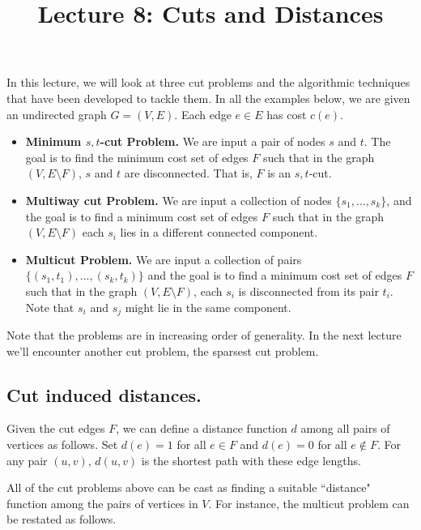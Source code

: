 \documentclass[11pt]{article}
\begin{document}
\title{Lecture 8: Cuts and Distances}
\author{}
\date{}
\maketitle
\def\x{{x^{\tt int}}}
\def\E{{\mathbf E}}
\def\Pr{{\mathbf{Pr}}}
\noindent
In this lecture, we will look at three cut problems and the algorithmic 
techniques that have been developed to tackle them. 
In all the examples below, we are given an undirected graph $G=(V,E)$.
Each edge $e\in E$ has cost $c(e)$.

\begin{itemize}
\item {\bf  Minimum $s,t$-cut Problem.} We are input a pair of nodes $s$ and $t$.
The goal is to find the minimum cost set of edges $F$ such that in the graph 
$(V,E\setminus F)$, $s$ and $t$ are disconnected. That is, $F$ is an $s,t$-cut.

\item {\bf Multiway cut Problem.} We are input a collection of nodes 
$\{s_1,\ldots,s_k\}$, and the goal is to find a minimum cost set of edges $F$
such that in the graph $(V,E\setminus F)$ each $s_i$ lies in a different
connected component.

\item {\bf Multicut Problem.} We are input a collection of pairs $\{(s_1,t_1),\ldots,(s_k,t_k)\}$
and the goal is to find a minimum cost set of edges $F$ such that 
in the graph $(V,E\setminus F)$, each $s_i$ is disconnected from its pair $t_i$.
Note that $s_i$ and $s_j$ might lie in the same component.

\end{itemize}
\noindent
Note that the problems are in increasing order of generality.
In the next lecture we'll encounter another cut problem, the sparsest 
cut problem. 

\subsection*{Cut induced distances.} Given the cut edges $F$, we can define 
a distance function $d$ among all pairs of vertices as follows. 
Set $d(e) = 1$ for all $e\in F$ and $d(e) = 0$ for all $e\notin F$. For any pair 
$(u,v)$, $d(u,v)$ is the shortest path with these edge lengths. 

All of the cut problems above can be cast as finding a suitable ``distance" function
among the pairs of vertices in $V$. For instance, the multicut problem can be restated 
as follows.
\end{document}
